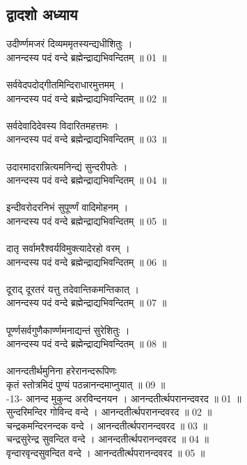 \subsection{\sanskrit द्वादशो अध्याय}
\sanskrit
उदीर्ण्णमजरं दिव्यममृतस्यन्द्यधीशितुः ।\\
आनन्दस्य पदं वन्दे ब्रह्मेन्द्राद्यभिवन्दितम् ॥ 01 ॥\\
\\
सर्ववेदपदोद्गीतमिन्दिराधारमुत्तमम् ।\\
आनन्दस्य पदं वन्दे ब्रह्मेन्द्राद्यभिवन्दितम् ॥ 02 ॥\\
\\
सर्वदेवादिदेवस्य विदारितमहत्तमः ।\\
आनन्दस्य पदं वन्दे ब्रह्मेन्द्राद्यभिवन्दितम् ॥ 03 ॥\\
\\
उदारमादरान्नित्यमनिन्द्यं सुन्दरीपतेः ।\\
आनन्दस्य पदं वन्दे ब्रह्मेन्द्राद्यभिवन्दितम् ॥ 04 ॥\\
\\
इन्दीवरोदरनिभं सुपूर्ण्णं वादिमोहनम् ।\\
आनन्दस्य पदं वन्दे ब्रह्मेन्द्राद्यभिवन्दितम् ॥ 05 ॥\\
\\
दातृ सर्वामरैश्वर्यविमुक्त्यादेरहो वरम् ।\\
आनन्दस्य पदं वन्दे ब्रह्मेन्द्राद्यभिवन्दितम् ॥ 06 ॥\\
\\
दूराद् दूरतरं यत्तु तदेवान्तिकमन्तिकात् ।\\
आनन्दस्य पदं वन्दे ब्रह्मेन्द्राद्यभिवन्दितम् ॥ 07 ॥\\
\\
पूर्ण्णसर्वगुणैकार्ण्णमनाद्यन्तं सुरेशितुः ।\\
आनन्दस्य पदं वन्दे ब्रह्मेन्द्राद्यभिवन्दितम् ॥ 08 ॥\\
\\
आनन्दतीर्थमुनिना हरेरानन्दरूपिणः\\
कृतं स्तोत्रमिदं पुण्यं पठन्नानन्दमाप्नुयात् ॥ 09 ॥\\
 -13-
आनन्द मुकुन्द अरविन्दनयन । आनन्दतीर्त्थपरानन्दवरद ॥ 01 ॥\\
सुन्दरिमन्दिर गोविन्द वन्दे । आनन्दतीर्त्थपरानन्दवरद ॥ 02 ॥\\
चन्द्रकमन्दिरनन्दक वन्दे । आनन्दतीर्त्थपरानन्दवरद ॥ 03 ॥\\
चन्द्रसुरेन्द्र सुवन्दित वन्दे । आनन्दतीर्त्थपरानन्दवरद ॥ 04 ॥\\
वृन्दारवृन्दसुवन्दित वन्दे । आनन्दतीर्त्थपरानन्दवरद ॥ 05 ॥\\
